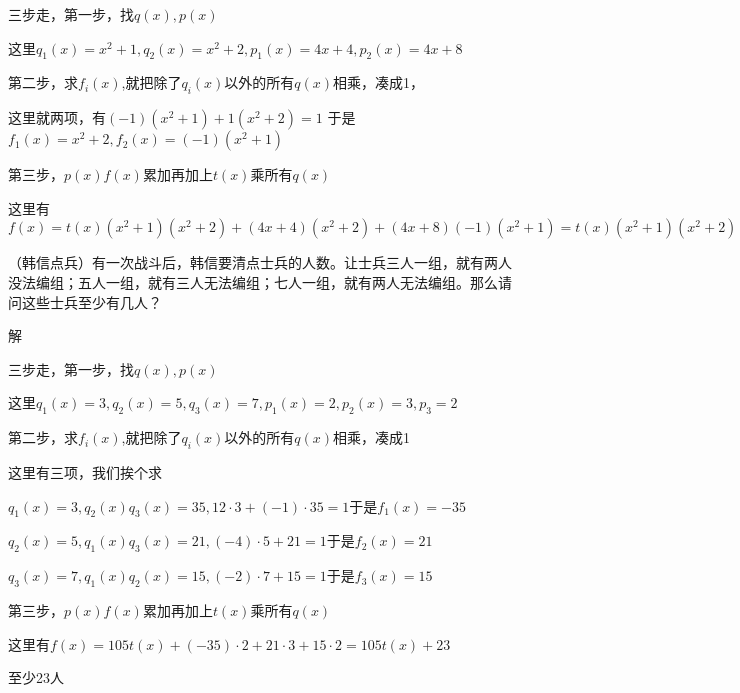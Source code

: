 \documentclass[lang=cn,10pt]{elegantbook}
\begin{document}
三步走，第一步，找$q(x),p(x)$

这里$q_{1}(x)=x^2+1,q_{2}(x)=x^2+2,p_{1}(x)=4x+4,p_{2}(x)=4x+8$

第二步，求$f_{i}(x)$,就把除了$q_{i}(x)$以外的所有$q(x)$相乘，凑成1，

这里就两项，有$(-1)(x^2+1)+1(x^2+2)=1$
于是$f_{1}(x)=x^2+2,f_{2}(x)=(-1)(x^2+1)$

第三步，$p(x)f(x)$累加再加上$t(x)$乘所有$q(x)$

这里有$f(x)=t(x)(x^2+1)(x^2+2)+(4x+4)(x^2+2)+(4x+8)(-1)(x^2+1)=t(x)(x^2+1)(x^2+2)-4x^{2}+4x$

\begin{example}
	（韩信点兵）有一次战斗后，韩信要清点士兵的人数。让士兵三人一组，就有两人没法编组；五人一组，就有三人无法编组；七人一组，就有两人无法编组。那么请问这些士兵至少有几人？
\end{example}
解

三步走，第一步，找$q(x),p(x)$

这里$q_{1}(x)=3,q_{2}(x)=5,q_{3}(x)=7,p_{1}(x)=2,p_{2}(x)=3,p_{3}=2$

第二步，求$f_{i}(x)$,就把除了$q_{i}(x)$以外的所有$q(x)$相乘，凑成1

这里有三项，我们挨个求

$q_{1}(x)=3,q_{2}(x)q_{3}(x)=35,12\cdot3+(-1)\cdot35=1$于是$f_{1}(x)=-35$

$q_{2}(x)=5,q_{1}(x)q_{3}(x)=21,(-4)\cdot5+21=1$于是$f_{2}(x)=21$

$q_{3}(x)=7,q_{1}(x)q_{2}(x)=15,(-2)\cdot7+15=1$于是$f_{3}(x)=15$

第三步，$p(x)f(x)$累加再加上$t(x)$乘所有$q(x)$

这里有$f(x)=105t(x)+(-35)\cdot2+21\cdot3+15\cdot2=105t(x)+23$

至少23人
\end{document}
